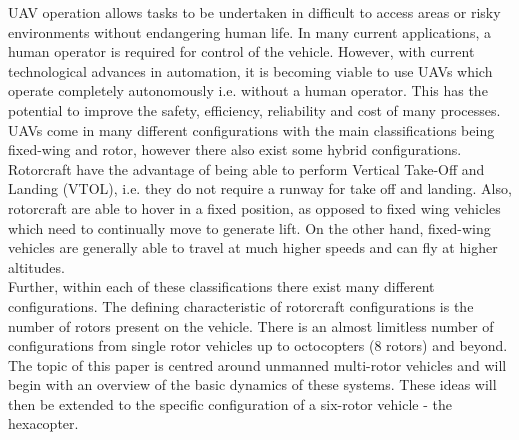UAV operation allows tasks to be undertaken in difficult to access areas or risky environments without endangering human life. In many current applications, a human operator is required for control of the vehicle. However, with current technological advances in automation, it is becoming viable to use UAVs which operate completely autonomously i.e. without a human operator. This has the potential to improve the safety, efficiency, reliability and cost of many processes.\\

UAVs come in many different configurations with the main classifications being fixed-wing and rotor, however there also exist some hybrid configurations. Rotorcraft have the advantage of being able to perform Vertical Take-Off and Landing (VTOL), i.e. they do not require a runway for take off and landing. Also, rotorcraft are able to hover in a fixed position, as opposed to fixed wing vehicles which need to continually move to generate lift. On the other hand, fixed-wing vehicles are generally able to travel at much higher speeds and can fly at higher altitudes. \\

Further, within each of these classifications there exist many different configurations. The defining characteristic of rotorcraft configurations is the number of rotors present on the vehicle. There is an almost limitless number of configurations from single rotor vehicles up to octocopters (8 rotors) and beyond. The topic of this paper is centred around unmanned multi-rotor vehicles and will begin with an overview of the basic dynamics of these systems. These ideas will then be extended to the specific configuration of a six-rotor vehicle - the hexacopter.

